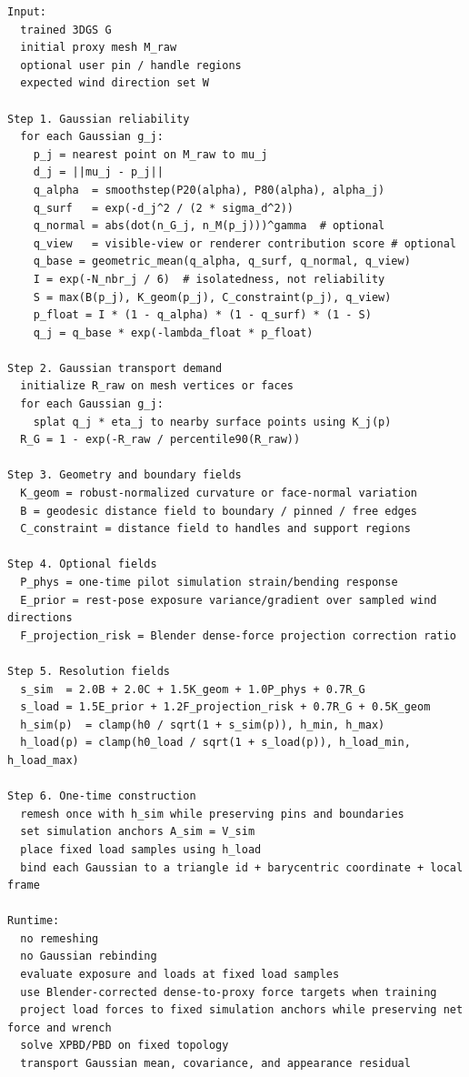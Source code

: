 \documentclass[11pt,a4paper]{article}
\begin{document}
\begin{lstlisting}
Input:
  trained 3DGS G
  initial proxy mesh M_raw
  optional user pin / handle regions
  expected wind direction set W

Step 1. Gaussian reliability
  for each Gaussian g_j:
    p_j = nearest point on M_raw to mu_j
    d_j = ||mu_j - p_j||
    q_alpha  = smoothstep(P20(alpha), P80(alpha), alpha_j)
    q_surf   = exp(-d_j^2 / (2 * sigma_d^2))
    q_normal = abs(dot(n_G_j, n_M(p_j)))^gamma  # optional
    q_view   = visible-view or renderer contribution score # optional
    q_base = geometric_mean(q_alpha, q_surf, q_normal, q_view)
    I = exp(-N_nbr_j / 6)  # isolatedness, not reliability
    S = max(B(p_j), K_geom(p_j), C_constraint(p_j), q_view)
    p_float = I * (1 - q_alpha) * (1 - q_surf) * (1 - S)
    q_j = q_base * exp(-lambda_float * p_float)

Step 2. Gaussian transport demand
  initialize R_raw on mesh vertices or faces
  for each Gaussian g_j:
    splat q_j * eta_j to nearby surface points using K_j(p)
  R_G = 1 - exp(-R_raw / percentile90(R_raw))

Step 3. Geometry and boundary fields
  K_geom = robust-normalized curvature or face-normal variation
  B = geodesic distance field to boundary / pinned / free edges
  C_constraint = distance field to handles and support regions

Step 4. Optional fields
  P_phys = one-time pilot simulation strain/bending response
  E_prior = rest-pose exposure variance/gradient over sampled wind directions
  F_projection_risk = Blender dense-force projection correction ratio

Step 5. Resolution fields
  s_sim  = 2.0B + 2.0C + 1.5K_geom + 1.0P_phys + 0.7R_G
  s_load = 1.5E_prior + 1.2F_projection_risk + 0.7R_G + 0.5K_geom
  h_sim(p)  = clamp(h0 / sqrt(1 + s_sim(p)), h_min, h_max)
  h_load(p) = clamp(h0_load / sqrt(1 + s_load(p)), h_load_min, h_load_max)

Step 6. One-time construction
  remesh once with h_sim while preserving pins and boundaries
  set simulation anchors A_sim = V_sim
  place fixed load samples using h_load
  bind each Gaussian to a triangle id + barycentric coordinate + local frame

Runtime:
  no remeshing
  no Gaussian rebinding
  evaluate exposure and loads at fixed load samples
  use Blender-corrected dense-to-proxy force targets when training
  project load forces to fixed simulation anchors while preserving net force and wrench
  solve XPBD/PBD on fixed topology
  transport Gaussian mean, covariance, and appearance residual
\end{lstlisting}
\end{document}
